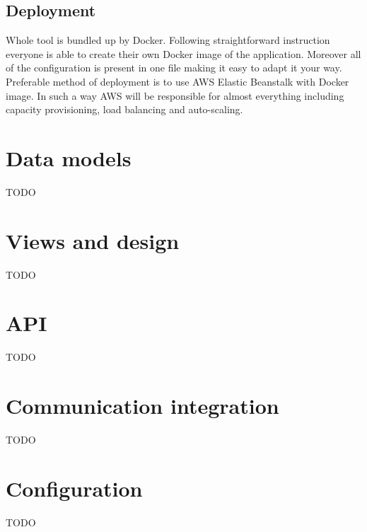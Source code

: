 \documentclass[licencjacka,en]{thesisclass}
\begin{document}
    \subsection{Deployment}

    Whole tool is bundled up by Docker. Following straightforward instruction everyone is able to create their own Docker image of the application. Moreover all of the configuration is present in one file making it easy to adapt it your way. Preferable method of deployment is to use AWS Elastic Beanstalk with Docker image. In such a way AWS will be responsible for almost everything including capacity provisioning, load balancing and auto-scaling.

    \section{Data models}
    TODO
    \section{Views and design}
    TODO
    \section{API}
    TODO
    \section{Communication integration}
    TODO
    \section{Configuration}
    TODO
\end{document}
